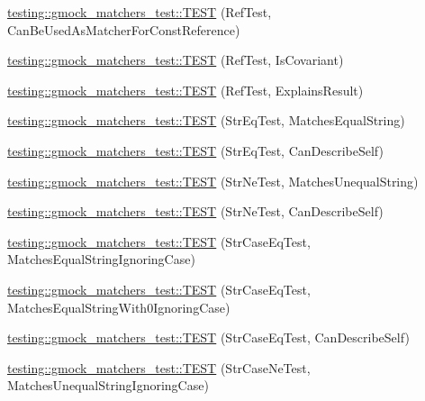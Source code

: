 \begin{DoxyCompactItemize}
\item 
\hyperlink{namespacetesting_1_1gmock__matchers__test_af1e64d057f2c46cc17f1c96a075cde6b}{testing\+::gmock\+\_\+matchers\+\_\+test\+::\+T\+E\+ST} (Ref\+Test, Can\+Be\+Used\+As\+Matcher\+For\+Const\+Reference)
\item 
\hyperlink{namespacetesting_1_1gmock__matchers__test_a03b45cf0f65f33208ac378b8603ff67a}{testing\+::gmock\+\_\+matchers\+\_\+test\+::\+T\+E\+ST} (Ref\+Test, Is\+Covariant)
\item 
\hyperlink{namespacetesting_1_1gmock__matchers__test_ab73595bcf8dd511b519b640248136ccd}{testing\+::gmock\+\_\+matchers\+\_\+test\+::\+T\+E\+ST} (Ref\+Test, Explains\+Result)
\item 
\hyperlink{namespacetesting_1_1gmock__matchers__test_a5956b46686ad29d2d29b313bce9eba8a}{testing\+::gmock\+\_\+matchers\+\_\+test\+::\+T\+E\+ST} (Str\+Eq\+Test, Matches\+Equal\+String)
\item 
\hyperlink{namespacetesting_1_1gmock__matchers__test_a1cb9d74bdf937816807e91b842b22c75}{testing\+::gmock\+\_\+matchers\+\_\+test\+::\+T\+E\+ST} (Str\+Eq\+Test, Can\+Describe\+Self)
\item 
\hyperlink{namespacetesting_1_1gmock__matchers__test_a3c0a0ca54e3d34c55bd30c2b5572d902}{testing\+::gmock\+\_\+matchers\+\_\+test\+::\+T\+E\+ST} (Str\+Ne\+Test, Matches\+Unequal\+String)
\item 
\hyperlink{namespacetesting_1_1gmock__matchers__test_a4daef0c28c6b07cb3d6a6306c05599b0}{testing\+::gmock\+\_\+matchers\+\_\+test\+::\+T\+E\+ST} (Str\+Ne\+Test, Can\+Describe\+Self)
\item 
\hyperlink{namespacetesting_1_1gmock__matchers__test_ae0c0b82b3895923747dc70cb9339a8dc}{testing\+::gmock\+\_\+matchers\+\_\+test\+::\+T\+E\+ST} (Str\+Case\+Eq\+Test, Matches\+Equal\+String\+Ignoring\+Case)
\item 
\hyperlink{namespacetesting_1_1gmock__matchers__test_aa159c9a52c6dc18cb7f214fbb5bddece}{testing\+::gmock\+\_\+matchers\+\_\+test\+::\+T\+E\+ST} (Str\+Case\+Eq\+Test, Matches\+Equal\+String\+With0\+Ignoring\+Case)
\item 
\hyperlink{namespacetesting_1_1gmock__matchers__test_ab4fb6542ea3a7789850668a9266a80ef}{testing\+::gmock\+\_\+matchers\+\_\+test\+::\+T\+E\+ST} (Str\+Case\+Eq\+Test, Can\+Describe\+Self)
\item 
\hyperlink{namespacetesting_1_1gmock__matchers__test_a9a627f8538cfff62fbaee86ac465f6c8}{testing\+::gmock\+\_\+matchers\+\_\+test\+::\+T\+E\+ST} (Str\+Case\+Ne\+Test, Matches\+Unequal\+String\+Ignoring\+Case)

\end{DoxyCompactItemize}

